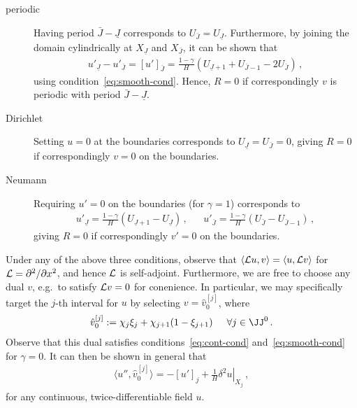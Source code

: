 \documentclass[12pt,a5paper]{article}
\begin{document}
\begin{description}
\item[periodic] Having period $\bar{J}-\underline{J}$ corresponds to \(U_{\bar{J}}=U_{\underline{J}}\). Furthermore, by joining
the domain cylindrically at $X_{\underline{J}}$ and $X_{\bar{J}}$,  it can be shown that
\begin{eqnarray}
u'_{\underline{J}}-u'_{\bar{J}} = [u']_{\bar{J}} = \frac{1-\gamma}{H}(U_{\underline{J}+1}+U_{\bar{J}-1}-2U_{\bar{J}})\,,
\end{eqnarray}
using condition~\eqref{eq:smooth-cond}. Hence, $R=0$ if correspondingly $v$ is periodic with period $\bar{J}-\underline{J}$.
\item[Dirichlet] Setting \(u=0\) at the boundaries corresponds to \(U_{\underline{J}}=U_{\bar{J}}=0\), 
giving $R=0$ if correspondingly \(v=0\) on the boundaries.
\item[Neumann] Requiring \(u'=0\) on the boundaries  (for $\gamma=1$) corresponds to 
\begin{eqnarray}
u'_{\underline{J}}=\frac{1-\gamma}{H}(U_{\underline{J}+1}-U_{\underline{J}})\,,
&&
u'_{\bar{J}}=\frac{1-\gamma}{H}(U_{\bar{J}}-U_{\bar{J}-1})\,,
\end{eqnarray}
giving $R=0$ if correspondingly \(v'=0\) on the boundaries.
\end{description}
Under any of the above three conditions, observe that $\langle{\cal L}u,v\rangle =\langle u,{\cal L}v\rangle$
for ${\cal L}=\DD {x}{}$, and hence ${\cal L}$ is self-adjoint.
Furthermore, we are free to choose any dual $v$, e.g.\ to satisfy ${\cal L}v=0$ for conenience.
In particular, we may specifically target the $j$-th interval for $u$ by selecting $v=\hat{v}_0^{[j]}$, where
\begin{eqnarray}
\hat{v}_0^{[j]} := \chi_j\xi_j + \chi_{j+1}(1-\xi_{j+1})\hspace*{5mm}\forall j\in\JJ^0\,.
\label{eq:vhat0}
\end{eqnarray}
Observe that this dual satisfies conditions~\eqref{eq:cont-cond} and~\eqref{eq:smooth-cond} for $\gamma=0$.
It can then be shown in general that
\begin{eqnarray}
\langle u'', \hat{v}_0^{[j]}\rangle = -[u']_j+\frac{1}{H}\left.\delta^2 u\right|_{X_j}\,,
\label{eq:udd:vhat0}
\end{eqnarray}
for any continuous, twice-differentiable field $u$.
\end{document}

